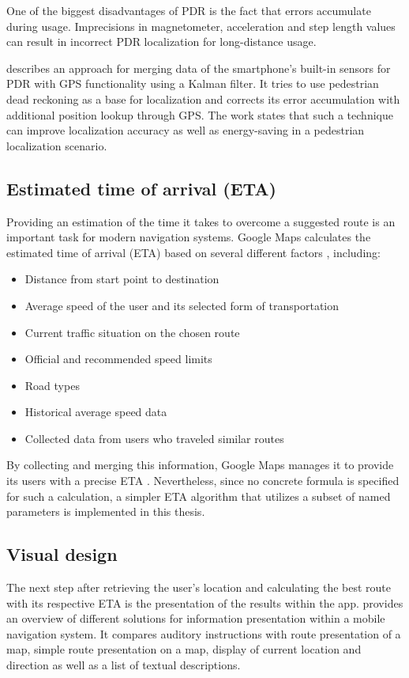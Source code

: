 One of the biggest disadvantages of PDR is the fact that errors accumulate during usage. Imprecisions in magnetometer, acceleration and step length values can result in incorrect PDR localization for long-distance usage.

\cite{localization_techniques} describes an approach for merging data of the smartphone's built-in sensors for PDR with GPS functionality using a Kalman filter. It tries to use pedestrian dead reckoning as a base for localization and corrects its error accumulation with additional position lookup through GPS. The work states that such a technique can improve localization accuracy as well as energy-saving in a pedestrian localization scenario.

\subsection{Estimated time of arrival (ETA)}
Providing an estimation of the time it takes to overcome a suggested route is an important task for modern navigation systems. Google Maps calculates the estimated time of arrival (ETA) based on several different factors \cite{google_maps}, including:

\begin{itemize}
    \item Distance from start point to destination
    \item Average speed of the user and its selected form of transportation
    \item Current traffic situation on the chosen route
    \item Official and recommended speed limits
    \item Road types
    \item Historical average speed data
    \item Collected data from users who traveled similar routes
\end{itemize}

By collecting and merging this information, Google Maps manages it to provide its users with a precise ETA \cite{google_maps}. Nevertheless, since no concrete formula is specified for such a calculation, a simpler ETA algorithm that utilizes a subset of named parameters is implemented in this thesis.

\subsection{Visual design}
The next step after retrieving the user's location and calculating the best route with its respective ETA is the presentation of the results within the app. \cite{visual_design_of_navigation_system} provides an overview of different solutions for information presentation within a mobile navigation system. It compares auditory instructions with route presentation of a map, simple route presentation on a map, display of current location and direction as well as a list of textual descriptions.

